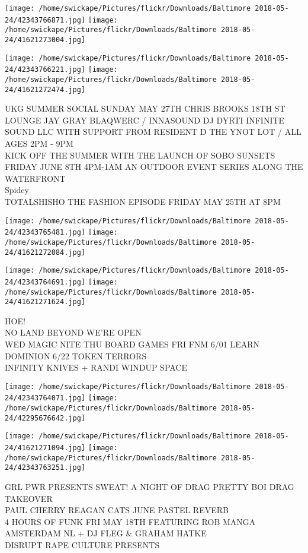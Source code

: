 \documentclass[10pt,letterpaper]{article}
\begin{document}
\texttt{[image: /home/swickape/Pictures/flickr/Downloads/Baltimore 2018-05-24/42343766871.jpg]}
\texttt{[image: /home/swickape/Pictures/flickr/Downloads/Baltimore 2018-05-24/41621273004.jpg]}

\texttt{[image: /home/swickape/Pictures/flickr/Downloads/Baltimore 2018-05-24/42343766221.jpg]}
\texttt{[image: /home/swickape/Pictures/flickr/Downloads/Baltimore 2018-05-24/41621272474.jpg]}

UKG SUMMER SOCIAL SUNDAY MAY 27TH CHRIS BROOKS 18TH ST LOUNGE JAY GRAY BLAQWERC / INNASOUND DJ DYRTI INFINITE SOUND LLC WITH SUPPORT FROM RESIDENT D THE YNOT LOT / ALL AGES 2PM {-} 9PM\\
KICK OFF THE SUMMER WITH THE LAUNCH OF SOBO SUNSETS FRIDAY JUNE 8TH 4PM{-}1AM AN OUTDOOR EVENT SERIES ALONG THE WATERFRONT\\
Spidey\\
TOTALSHISHO THE FASHION EPISODE FRIDAY MAY 25TH AT 8PM
\pagebreak

\texttt{[image: /home/swickape/Pictures/flickr/Downloads/Baltimore 2018-05-24/42343765481.jpg]}
\texttt{[image: /home/swickape/Pictures/flickr/Downloads/Baltimore 2018-05-24/41621272084.jpg]}

\texttt{[image: /home/swickape/Pictures/flickr/Downloads/Baltimore 2018-05-24/42343764691.jpg]}
\texttt{[image: /home/swickape/Pictures/flickr/Downloads/Baltimore 2018-05-24/41621271624.jpg]}

HOE!\\
NO LAND BEYOND WE'RE OPEN\\
WED MAGIC NITE THU BOARD GAMES FRI FNM 6/01 LEARN DOMINION 6/22 TOKEN TERRORS\\
INFINITY KNIVES + RANDI WINDUP SPACE
\pagebreak

\texttt{[image: /home/swickape/Pictures/flickr/Downloads/Baltimore 2018-05-24/42343764071.jpg]}
\texttt{[image: /home/swickape/Pictures/flickr/Downloads/Baltimore 2018-05-24/42295676642.jpg]}

\texttt{[image: /home/swickape/Pictures/flickr/Downloads/Baltimore 2018-05-24/41621271094.jpg]}
\texttt{[image: /home/swickape/Pictures/flickr/Downloads/Baltimore 2018-05-24/42343763251.jpg]}

GRL PWR PRESENTS SWEAT!  A NIGHT OF DRAG PRETTY BOI DRAG TAKEOVER\\
PAUL CHERRY REAGAN CATS JUNE PASTEL REVERB\\
4 HOURS OF FUNK FRI MAY 18TH FEATURING ROB MANGA AMSTERDAM NL + DJ FLEG \& GRAHAM HATKE\\
DISRUPT RAPE CULTURE PRESENTS
\pagebreak
\end{document}
